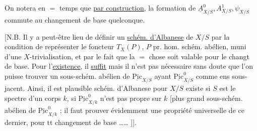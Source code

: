 On notera en $=$ temps que \uline{par construction}, 
la formation de $\underline A^0_{X/S},A^1_{X/S},\psi_{X/S}$ commute au
changement de base quelconque.

[N.B. Il y a peut-être lieu de définir
 un \uline{schém. d'Albanese} de $X/S$ par
la condition de représenter le foncteur $T_X(P)$, $P$
pr. hom.  schém. abélien, muni d'une $X$-trivialisation,
et par le fait que la $=$ chose soit valable pour
le changt de base. Pour l'\uline{existence}, il \uline{suffit}
mais il n'est pas nécessaire sans doute que
l'on puisse trouver un sous-schém. abélien
de $\underline{\mathrm{Pic}}_{X/S}$ ayant $\underline{\mathrm{Pic}}^0_{X/S}$ comme ens sous-jacent.
Ainsi, il est plausible  schém. d'Albanese
pour $X/S$ existe si $S$ est le spectre d'un corps
$k$,  si $\underline{\mathrm{Pic}}^0_{X/k}$ n'est pas propre sur $k$
[plus grand sous-schém. abélien de $\underline{\mathrm{Pic}}^0_{X/k}$ ; il faut
prouver évidemment une propriété universelle de
ce dernier, pour tt changement de base \ldots\ldots{} ]].


